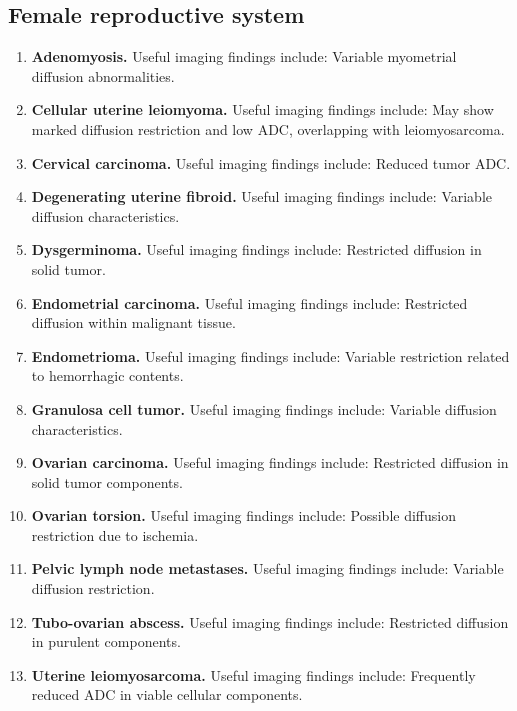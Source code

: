 \subsection{Female reproductive system}
\begin{enumerate}[leftmargin=*,itemsep=0.45em,topsep=0.4em]
\item \textbf{Adenomyosis.} Useful imaging findings include: Variable myometrial diffusion abnormalities.
\item \textbf{Cellular uterine leiomyoma.} Useful imaging findings include: May show marked diffusion restriction and low ADC, overlapping with leiomyosarcoma.
\item \textbf{Cervical carcinoma.} Useful imaging findings include: Reduced tumor ADC.
\item \textbf{Degenerating uterine fibroid.} Useful imaging findings include: Variable diffusion characteristics.
\item \textbf{Dysgerminoma.} Useful imaging findings include: Restricted diffusion in solid tumor.
\item \textbf{Endometrial carcinoma.} Useful imaging findings include: Restricted diffusion within malignant tissue.
\item \textbf{Endometrioma.} Useful imaging findings include: Variable restriction related to hemorrhagic contents.
\item \textbf{Granulosa cell tumor.} Useful imaging findings include: Variable diffusion characteristics.
\item \textbf{Ovarian carcinoma.} Useful imaging findings include: Restricted diffusion in solid tumor components.
\item \textbf{Ovarian torsion.} Useful imaging findings include: Possible diffusion restriction due to ischemia.
\item \textbf{Pelvic lymph node metastases.} Useful imaging findings include: Variable diffusion restriction.
\item \textbf{Tubo-ovarian abscess.} Useful imaging findings include: Restricted diffusion in purulent components.
\item \textbf{Uterine leiomyosarcoma.} Useful imaging findings include: Frequently reduced ADC in viable cellular components.
\end{enumerate}


